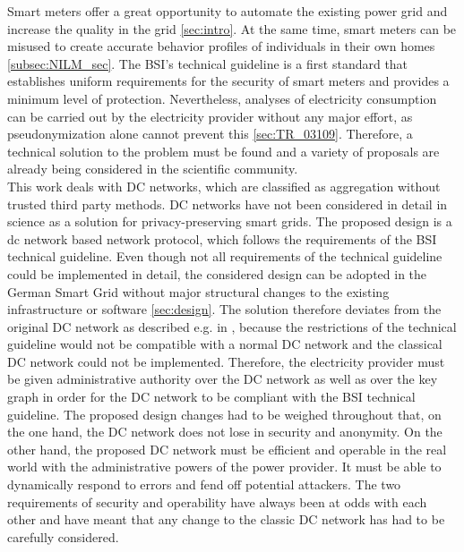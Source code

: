 Smart meters offer a great opportunity to automate the existing power grid and increase the quality in the grid \ref{sec:intro}. At the same time, smart meters can be misused to create accurate behavior profiles of individuals in their own homes \ref{subsec:NILM_sec}. The BSI's technical guideline is a first standard that establishes uniform requirements for the security of smart meters and provides a minimum level of protection. Nevertheless, analyses of electricity consumption can be carried out by the electricity provider without any major effort, as pseudonymization alone cannot prevent this \ref{sec:TR_03109}. Therefore, a technical solution to the problem must be found and a variety of proposals are already being considered in the scientific community.\\ This work deals with DC networks, which are classified as aggregation without trusted third party methods. DC networks have not been considered in detail in science as a solution for privacy-preserving smart grids. The proposed design is a dc network based network protocol, which follows the requirements of the BSI technical guideline. Even though not all requirements of the technical guideline could be implemented in detail, the considered design can be adopted in the German Smart Grid without major structural changes to the existing infrastructure or software \ref{sec:design}. The solution therefore deviates from the original DC network as described e.g. in \cite{chaum1988dining}, because the restrictions of the technical guideline would not be compatible with a normal DC network and the classical DC network could not be implemented. Therefore, the electricity provider must be given administrative authority over the DC network as well as over the key graph in order for the DC network to be compliant with the BSI technical guideline. The proposed design changes had to be weighed throughout that, on the one hand, the DC network does not lose in security and anonymity. On the other hand, the proposed DC network must be efficient and operable in the real world with the administrative powers of the power provider. It must be able to dynamically respond to errors and fend off potential attackers. The two requirements of security and operability have always been at odds with each other and have meant that any change to the classic DC network has had to be carefully considered. \\
